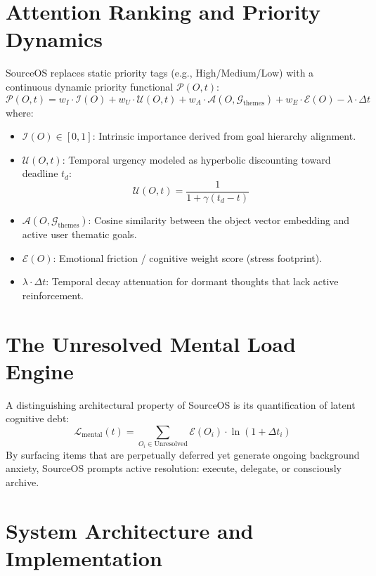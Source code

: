 \documentclass[11pt,a4paper]{article}
\begin{document}
\section{Attention Ranking and Priority Dynamics}
SourceOS replaces static priority tags (e.g., High/Medium/Low) with a continuous dynamic priority functional $\mathcal{P}(O, t)$:
\begin{equation}
\mathcal{P}(O, t) = w_I \cdot \mathcal{I}(O) + w_U \cdot \mathcal{U}(O, t) + w_A \cdot \mathcal{A}(O, \mathcal{G}_{\text{themes}}) + w_E \cdot \mathcal{E}(O) - \lambda \cdot \Delta t
\end{equation}
where:
\begin{itemize}
    \item $\mathcal{I}(O) \in [0, 1]$: Intrinsic importance derived from goal hierarchy alignment.
    \item $\mathcal{U}(O, t)$: Temporal urgency modeled as hyperbolic discounting toward deadline $t_d$:
    \begin{equation}
    \mathcal{U}(O, t) = \frac{1}{1 + \gamma (t_d - t)}
    \end{equation}
    \item $\mathcal{A}(O, \mathcal{G}_{\text{themes}})$: Cosine similarity between the object vector embedding and active user thematic goals.
    \item $\mathcal{E}(O)$: Emotional friction / cognitive weight score (stress footprint).
    \item $\lambda \cdot \Delta t$: Temporal decay attenuation for dormant thoughts that lack active reinforcement.
\end{itemize}

\section{The Unresolved Mental Load Engine}
A distinguishing architectural property of SourceOS is its quantification of latent cognitive debt:
\begin{equation}
\mathcal{L}_{\text{mental}}(t) = \sum_{O_i \in \text{Unresolved}} \mathcal{E}(O_i) \cdot \ln(1 + \Delta t_i)
\end{equation}
By surfacing items that are perpetually deferred yet generate ongoing background anxiety, SourceOS prompts active resolution: execute, delegate, or consciously archive.

\section{System Architecture and Implementation}
\end{document}

